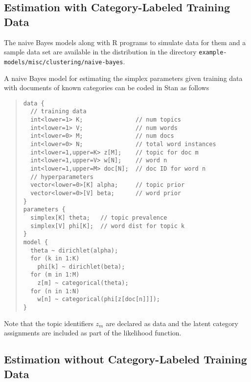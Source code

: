 \subsection{Estimation with Category-Labeled Training Data}

The naive Bayes models along with R programs to simulate data for them
and a sample data set are available in the distribution in the
directory \nolinkurl{example-models/misc/clustering/naive-bayes}.

A naive Bayes model for estimating the simplex parameters given
training data with documents of known categories can be coded in Stan
as follows 
%
\begin{quote}
\begin{Verbatim}[fontsize=\small]
data {
  // training data
  int<lower=1> K;               // num topics
  int<lower=1> V;               // num words
  int<lower=0> M;               // num docs
  int<lower=0> N;               // total word instances
  int<lower=1,upper=K> z[M];    // topic for doc m
  int<lower=1,upper=V> w[N];    // word n
  int<lower=1,upper=M> doc[N];  // doc ID for word n
  // hyperparameters
  vector<lower=0>[K] alpha;     // topic prior
  vector<lower=0>[V] beta;      // word prior
}
parameters {
  simplex[K] theta;   // topic prevalence
  simplex[V] phi[K];  // word dist for topic k
}
model {
  theta ~ dirichlet(alpha);
  for (k in 1:K)  
    phi[k] ~ dirichlet(beta);
  for (m in 1:M)
    z[m] ~ categorical(theta);
  for (n in 1:N)
    w[n] ~ categorical(phi[z[doc[n]]]);
}
\end{Verbatim}
\end{quote}
%
Note that the topic identifiers $z_m$ are declared as data and the
latent category assignments are included as part of the likelihood
function.  

\subsection{Estimation without Category-Labeled Training Data}

